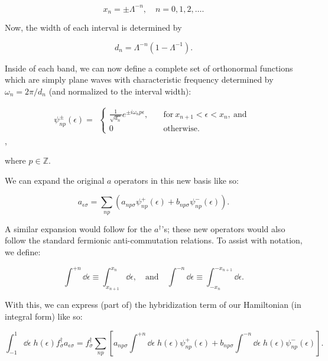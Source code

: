 \begin{equation}
  x_n = \pm\Lambda^{-n}, \quad n=0,1,2,\ldots.
\end{equation}

Now, the width of each interval is determined by

\begin{equation}
  d_n = \Lambda^{-n}(1 - \Lambda^{-1}).
\end{equation}

Inside of each band, we can now define a complete set of orthonormal functions which are simply plane waves with characteristic frequency determined by $\omega_n = 2\pi/d_n$ (and normalized to the interval width):

\begin{equation}
  \psi^\pm_{np}(\epsilon) =
  \begin{alignedat}{1}
    \begin{cases}
      \frac{1}{\sqrt{d_n}}e^{\pm i\omega_n p\epsilon}, \quad & \text{for}\ x_{n+1} < \epsilon < x_n,\ \text{and} \\
      0 & \text{otherwise}.
    \end{cases}
  \end{alignedat}
\end{equation},

where $p \in \mathbb{Z}$.

We can expand the original $a$ operators in this new basis like so:

\begin{equation}
  a_{\epsilon\sigma} = \sum_{np}\left(a_{np\sigma}\psi^+_{np}(\epsilon) + b_{np\sigma}\psi^-_{np}(\epsilon)\right).
\end{equation}

A similar expansion would follow for the $a^\dagger$'s; these new operators would also follow the standard fermionic anti-commutation relations. To assist with notation, we define:

\begin{equation}
  \int^{+n}\dd\epsilon \equiv \int_{x_{n+1}}^{x_n}\dd\epsilon, \quad\text{and}\quad \int^{-n}\dd\epsilon \equiv \int_{-x_n}^{-x_{n+1}}\dd\epsilon.
\end{equation}

With this, we can express (part of) the hybridization term of our Hamiltonian (in integral form) like so:

\begin{equation}
  \int_{-1}^1\dd\epsilon \; h(\epsilon) f^\dagger_\sigma a_{\epsilon\sigma} = f^\dagger_\sigma \sum_{np} \left[ a_{np\sigma}\int^{+n}\dd\epsilon \; h(\epsilon)\psi^+_{np}(\epsilon) + b_{np\sigma}\int^{-n}\dd\epsilon \; h(\epsilon) \psi^-_{np}(\epsilon) \right].
\end{equation}

